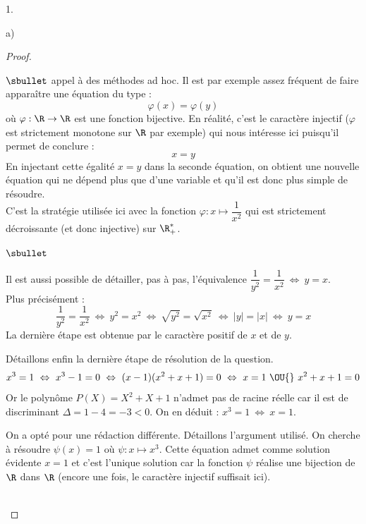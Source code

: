 \documentclass[11pt]{article}%
\begin{document}
\begin{noliste}{1.}
\begin{noliste}{a)}
\begin{proof}
\begin{remarkL}{.98}
\begin{noliste}{$\sbullet$}
          appel à des méthodes ad hoc. Il est par exemple assez
          fréquent de faire apparaître une équation du type :
          \[
          \varphi(x) = \varphi(y)
          \]
          où $\varphi : \R \to \R$ est une fonction bijective. En
          réalité, c'est le caractère injectif ($\varphi$ est
          strictement monotone sur $\R$ par exemple) qui nous
          intéresse ici puisqu'il permet de conclure : 
          \[
          x = y
          \]
          En injectant cette égalité $x = y$ dans la seconde équation,
          on obtient une nouvelle équation qui ne dépend plus que
          d'une variable et qu'il est donc plus simple de résoudre.\\[.1cm]
          C'est la stratégie utilisée ici avec la fonction $\varphi :
          x \mapsto \dfrac{1}{x^2}$ qui est strictement décroissante
          (et donc injective) sur $\R_+^*$.
        \end{noliste}
      \end{remarkL}


      \newpage


      \begin{remarkL}{.98}%
        \begin{noliste}{$\sbullet$}
        \item Il est aussi possible de détailler, pas à pas,
          l'équivalence $\dfrac{1}{y^2} = \dfrac{1}{x^2} \
          \Leftrightarrow \ y = x$.\\
          Plus précisément :
          \[
          \dfrac{1}{y^2} = \dfrac{1}{x^2} \ \Leftrightarrow \ y^2 =
          x^2 \ \Leftrightarrow \ \sqrt{y^2} = \sqrt{x^2} \
          \Leftrightarrow \ |y| = |x| \ \Leftrightarrow \ y = x
          \]
          La dernière étape est obtenue par le caractère positif de
          $x$ et de $y$.

        \item Détaillons enfin la dernière étape de résolution de la
          question.
          \[
          x^3 = 1 \ \Leftrightarrow \ x^3 - 1 = 0 \ \Leftrightarrow \
          (x - 1) (x^2 + x + 1) = 0 \ \Leftrightarrow \ \text{$x = 1$
            $\OU{}$ $x^2 + x + 1 = 0$}
          \]
          Or le polynôme $P(X) = X^2 + X + 1$ n'admet pas de racine
          réelle car il est de discriminant $\Delta = 1 - 4 = -3 <
          0$. On en déduit : $x^3 = 1 \ \Leftrightarrow \ x =
          1$.

        \item On a opté pour une rédaction différente. Détaillons
          l'argument utilisé. On cherche à résoudre $\psi(x) = 1$ où
          $\psi : x \mapsto x^3$. Cette équation admet comme solution
          évidente $x = 1$ et c'est l'unique solution car la fonction
          $\psi$ réalise une bijection de $\R$ dans $\R$ (encore une
          fois, le caractère injectif suffisait ici).
        \end{noliste}
      \end{remarkL}~\\[-1.6cm]
    \end{proof}
    

\end{noliste}
\end{noliste}
\end{document}
